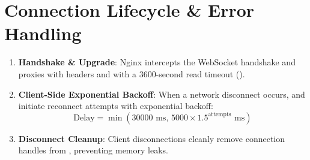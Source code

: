 \section{Connection Lifecycle \& Error Handling}
\begin{enumerate}[leftmargin=6mm,itemsep=1.5mm]
    \item \textbf{Handshake \& Upgrade}: Nginx intercepts the WebSocket handshake and proxies with headers  and  with a 3600-second read timeout ().
    \item \textbf{Client-Side Exponential Backoff}:
    When a network disconnect occurs,  and  initiate reconnect attempts with exponential backoff:
    \begin{equation}
        \mathrm{Delay} = \min\left( 30000\text{ ms}, \, 5000 \times 1.5^{\mathrm{attempts}}\text{ ms} \right)
    \end{equation}
    \item \textbf{Disconnect Cleanup}: Client disconnections cleanly remove connection handles from , preventing memory leaks.
\end{enumerate}
